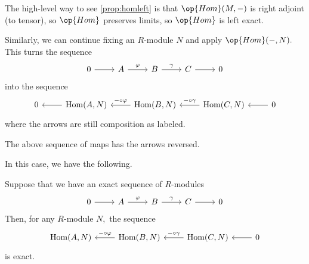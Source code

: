 \documentclass[../notes.tex]{subfiles}
\begin{document}
\begin{remark}
	The high-level way to see \autoref{prop:homleft} is that $\op{Hom}(M,-)$ is right adjoint (to tensor), so $\op{Hom}$ preserves limits, so $\op{Hom}$ is left exact.
\end{remark}
Similarly, we can continue fixing an $R$-module $N$ and apply $\op{Hom}(-,N).$ This turns the sequence
\[\begin{tikzcd}
	0 & A & B & C & 0
	\arrow[from=1-1, to=1-2]
	\arrow["\varphi", from=1-2, to=1-3]
	\arrow["\gamma", from=1-3, to=1-4]
	\arrow[from=1-4, to=1-5]
\end{tikzcd}\]
into the sequence
\[\begin{tikzcd}
	0 & {\operatorname{Hom}(A,N)} & {\operatorname{Hom}(B,N)} & {\operatorname{Hom}(C,N)} & 0
	\arrow[from=1-2, to=1-1]
	\arrow["{-\circ\varphi}"', from=1-3, to=1-2]
	\arrow["{-\circ\gamma}"', from=1-4, to=1-3]
	\arrow[from=1-5, to=1-4]
\end{tikzcd}\]
where the arrows are still composition as labeled.
\begin{warn}
	The above sequence of maps has the arrows reversed.
\end{warn}
In this case, we have the following.
\begin{proposition}
	Suppose that we have an exact sequence of $R$-modules
	\[\begin{tikzcd}
		0 & A & B & C & 0
		\arrow[from=1-1, to=1-2]
		\arrow["\varphi", from=1-2, to=1-3]
		\arrow["\gamma", from=1-3, to=1-4]
		\arrow[from=1-4, to=1-5]
	\end{tikzcd}\]
	Then, for any $R$-module $N,$ the sequence
	\[\begin{tikzcd}
		{\operatorname{Hom}(A,N)} & {\operatorname{Hom}(B,N)} & {\operatorname{Hom}(C,N)} & 0
		\arrow["{-\circ\varphi}"', from=1-2, to=1-1]
		\arrow["{-\circ\gamma}"', from=1-3, to=1-2]
		\arrow[from=1-4, to=1-3]
	\end{tikzcd}\]
	is exact.
\end{proposition}
\end{document}
